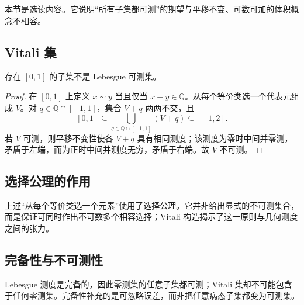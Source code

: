 
本节是选读内容。它说明“所有子集都可测”的期望与平移不变、可数可加的体积概念不相容。

\subsection{Vitali 集}
\label{b1:subsec:030501}

\begin{theorem}\label{b1:thm:vitali}
存在 \([0,1]\) 的子集不是 Lebesgue 可测集。
\end{theorem}
\begin{proof}
在 \([0,1]\) 上定义 \(x\sim y\) 当且仅当 \(x-y\in\mathbb Q\)。从每个等价类选一个代表元组成 \(V\)。对 \(q\in\mathbb Q\cap[-1,1]\)，集合 \(V+q\) 两两不交，且
\[
[0,1]\subseteq\bigcup_{q\in\mathbb Q\cap[-1,1]}(V+q)\subseteq[-1,2].
\]
若 \(V\) 可测，则平移不变性使各 \(V+q\) 具有相同测度；该测度为零时中间并零测，矛盾于左端，而为正时中间并测度无穷，矛盾于右端。故 \(V\) 不可测。
\end{proof}

\subsection{选择公理的作用}
\label{b1:subsec:030502}

上述“从每个等价类选一个元素”使用了选择公理。它并非给出显式的不可测集合，而是保证可同时作出不可数多个相容选择；Vitali 构造揭示了这一原则与几何测度之间的张力。

\subsection{完备性与不可测性}
\label{b1:subsec:030503}

Lebesgue 测度是完备的，因此零测集的任意子集都可测；Vitali 集却不可能包含于任何零测集。完备性补充的是可忽略误差，而非把任意病态子集都变为可测集。
